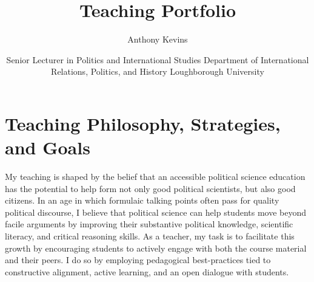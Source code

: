 \documentclass[11pt]{article}
\begin{document}
\begin{spacing}{0}
	\title{\huge \textbf{Teaching Portfolio}}
	\author{\LARGE Anthony Kevins}
	\date{Senior Lecturer in Politics and International Studies \endgraf
	Department of International Relations, Politics, and History \endgraf 
	Loughborough University}
	
	\maketitle
	
\end{spacing}

\tableofcontents

\bigskip
\setlength\fboxsep{0.25cm}
\noindent{}


\newpage

\section{ Teaching Philosophy, Strategies, and Goals}

My teaching is shaped by the belief that an accessible political science education has the potential to help form not only good political scientists, but also good citizens. In an age in which formulaic talking points often pass for quality political discourse, I believe that political science can help students move beyond facile arguments by improving their substantive political knowledge, scientific literacy, and critical reasoning skills. As a teacher, my task is to facilitate this growth by encouraging students to actively engage with both the course material and their peers. I do so by employing pedagogical best-practices tied to constructive alignment, active learning, and an open dialogue with students.
\end{document}
